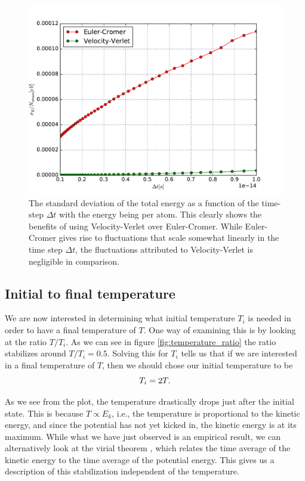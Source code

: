 \documentclass[a4paper]{article}
\begin{document}
    \begin{figure}[h]
        \centering \includegraphics[width=0.8\linewidth]{energy_fluctuations.pdf}
        \caption[Energy fluctuations]{The standard deviation of the total energy as
            a function of the time-step $\Delta t$ with the energy being per atom.
            This clearly shows the benefits of using Velocity-Verlet over
        Euler-Cromer. While Euler-Cromer gives rise to fluctuations that scale
    somewhat linearly in the time step $\Delta t$, the fluctuations attributed to
    Velocity-Verlet is negligible in comparison.}
        \label{fig:energy_fluctuations}
    \end{figure}

\subsection{Initial to final temperature}
\label{sub:initial_to_final_temperature}

    We are now interested in determining what initial temperature $T_i$ is needed
    in order to have a final temperature of $T$.  One way of examining this is by
    looking at the ratio $T/T_i$. As we can see in figure \ref{fig:temperature_ratio} the
    ratio stabilizes around $T/T_i = 0.5$. Solving this for $T_i$ tells us that if
    we are interested in a final temperature of $T$, then we should chose our
    initial temperature to be
    \begin{equation}
        \notag
        T_i = 2T.
    \end{equation}

    As we see from the plot, the temperature drastically drops just after the
    initial state. This is because $T \propto E_k$, i.e., the temperature is
    proportional to the kinetic energy, and since the potential has not yet kicked
    in, the kinetic energy is at its maximum. While what we have just observed is
    an empirical result, we can alternatively look at the virial theorem
    \cite{virial}, which relates the time average of the kinetic energy to the time
    average of the potential energy. This gives us a description of this
    stabilization independent of the temperature. 
\end{document}
